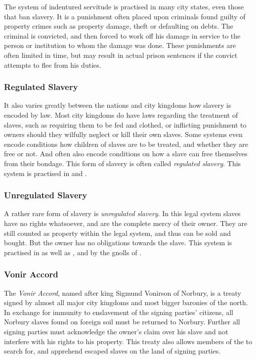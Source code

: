 The system of indentured servitude is practised in many city states, even
those that ban slavery. It is a punishment often placed upon criminals found
guilty of property crimes such as property damage, theft or defaulting on
debts. The criminal is convicted, and then forced to work off his damage in
service to the person or institution to whom the damage was done. These
punishments are often limited in time, but may result in actual prison
sentences if the convict attempts to flee from his duties.

\subsubsection{Regulated Slavery}
\label{sec:Regulated Slavery}

It also varies greatly between the nations and city kingdoms how slavery is
encoded by law. Most city kingdoms do have laws regarding the treatment of
slaves, such as requiring them to be fed and clothed, or inflicting punishment
to owners should they wilfully neglect or kill their own slaves. Some systems
even encode conditions how children of slaves are to be treated, and whether
they are free or not. And often also encode conditions on how a slave can free
themselves from their bondage. This form of slavery is often called
\emph{regulated slavery}. This system is practised in 
and .

\subsubsection{Unregulated Slavery}
\label{sec:Unregulated Slavery}

A rather rare form of slavery is \emph{unregulated slavery}. In this legal
system slaves have no rights whatsoever, and are the complete mercy of their
owner. They are still counted as property within the legal system, and thus
can be sold and bought. But the owner has no obligations towards the slave.
This system is practised in  as well as
, and by the gnolls of .

\subsubsection{Vonir Accord}
\label{sec:Vonir Accord}

The \emph{Vonir Accord}, named after king Sigmund Vonirson of Norbury, is a
treaty signed by almost all major city kingdoms and most bigger baronies of
the north. In exchange for immunity to enslavement of the signing parties'
citizens, all Norbury slaves found on foreign soil must be returned to
Norbury. Further all signing parties must acknowledge the owner's claim over
his slave and not interfere with his rights to his property. This treaty
also allows members of the  to search for, and
apprehend escaped slaves on the land of signing parties.
